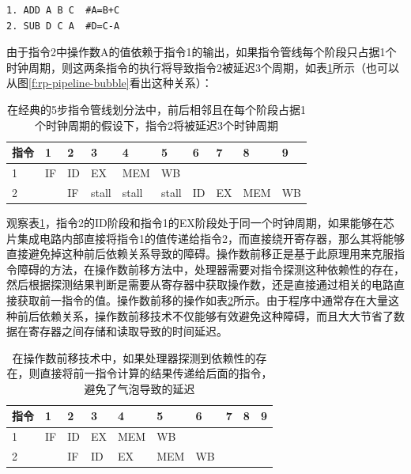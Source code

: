 \begin{lstlisting}
1. ADD A B C  #A=B+C
2. SUB D C A  #D=C-A
\end{lstlisting}

由于指令2中操作数A的值依赖于指令1的输出，如果指令管线每个阶段只占据1个时钟周期，则这两条指令的执行将导致指令2被延迟3个周期，如表\ref{t:rp-pipeline-bubble}所示（也可以从图\ref{f:rp-pipeline-bubble}看出这种关系）：

\begin{table}
\caption{在经典的5步指令管线划分法中，前后相邻且在每个阶段占据1个时钟周期的假设下，指令2将被延迟3个时钟周期}
\label{t:rp-pipeline-bubble}

\begin{tabular}{p{}|p{}|p{}|p{}|p{}|p{}|p{}|p{}|p{}|p{}}
\hline 
   指令&1&2&3&4&5&6&7&8&9  \\
    \hline  
 1&IF&ID&EX&MEM&WB&&&&\\
 2&&IF&stall&stall&stall&ID&EX&MEM&WB\\
 \hline 
\end{tabular}
\end{table}

观察表\ref{t:rp-pipeline-bubble}，指令2的ID阶段和指令1的EX阶段处于同一个时钟周期，如果能够在芯片集成电路内部直接将指令1的值传递给指令2，而直接绕开寄存器，那么其将能够直接避免掉这种前后依赖关系导致的障碍。操作数前移正是基于此原理用来克服指令障碍的方法，在操作数前移方法中，处理器需要对指令探测这种依赖性的存在，然后根据探测结果判断是需要从寄存器中获取操作数，还是直接通过相关的电路直接获取前一指令的值。操作数前移的操作如表\ref{t:rp-operand-forwarding}所示。由于程序中通常存在大量这种前后依赖关系，操作数前移技术不仅能够有效避免这种障碍，而且大大节省了数据在寄存器之间存储和读取导致的时间延迟。

\begin{table}
\caption{在操作数前移技术中，如果处理器探测到依赖性的存在，则直接将前一指令计算的结果传递给后面的指令，避免了气泡导致的延迟}
\label{t:rp-operand-forwarding}

\begin{tabular}{p{}|p{}|p{}|p{}|p{}|p{}|p{}|p{}|p{}|p{}}
\hline 
   指令&1&2&3&4&5&6&7&8&9  \\
    \hline  
 1&IF&ID&EX&MEM&WB&&&&\\
 2&&IF&ID&EX&MEM&WB&&&\\
 \hline 
\end{tabular}
\end{table}



